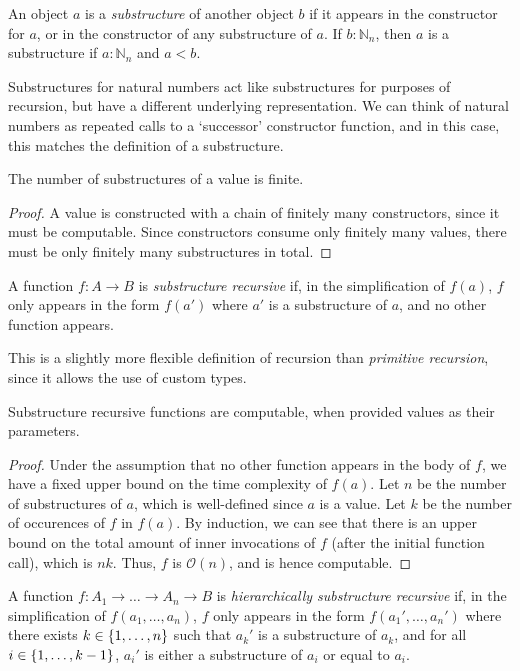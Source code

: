 \documentclass[11pt]{book}
\begin{document}

\begin{defn}
  An object \( a \) is a \textit{substructure} of another object \( b \) if it appears in the constructor for \( a \), or in the constructor of any substructure of \( a \).
  If \( b: \mathbb N_n \), then \( a \) is a substructure if \( a: \mathbb N_n \) and \( a < b \).
\end{defn}
Substructures for natural numbers act like substructures for purposes of recursion, but have a different underlying representation.
We can think of natural numbers as repeated calls to a `successor' constructor function, and in this case, this matches the definition of a substructure.
\begin{lem}
  The number of substructures of a value is finite.
\end{lem}
\begin{proof}
  A value is constructed with a chain of finitely many constructors, since it must be computable.
  Since constructors consume only finitely many values, there must be only finitely many substructures in total.
\end{proof}
\begin{defn}
  A function \( f: A \to B \) is \textit{substructure recursive} if, in the simplification of \( f(a) \), \( f \) only appears in the form \( f(a') \) where \( a' \) is a substructure of \( a \), and no other function appears.
\end{defn}
This is a slightly more flexible definition of recursion than \textit{primitive recursion}, since it allows the use of custom types.
\begin{lem}
  Substructure recursive functions are computable, when provided values as their parameters.
\end{lem}
\begin{proof}
  Under the assumption that no other function appears in the body of \( f \), we have a fixed upper bound on the time complexity of \( f(a) \).
  Let \( n \) be the number of substructures of \( a \), which is well-defined since \( a \) is a value.
  Let \( k \) be the number of occurences of \( f \) in \( f(a) \).
  By induction, we can see that there is an upper bound on the total amount of inner invocations of \( f \) (after the initial function call), which is \( nk \).
  Thus, \( f \) is \( \mathcal O(n) \), and is hence computable.
\end{proof}
\begin{defn}
  A function \( f: A_1 \to \dots \to A_n \to B \) is \textit{hierarchically substructure recursive} if, in the simplification of \( f(a_1, \dots, a_n) \), \( f \) only appears in the form \( f(a_1', \dots, a_n') \) where there exists \( k \in \qty{1, \dots, n} \) such that \( a_k' \) is a substructure of \( a_k \), and for all \( i \in \qty{1, \dots, k-1} \), \( a_i' \) is either a substructure of \( a_i \) or equal to \( a_i \).
\end{defn}
\end{document}
